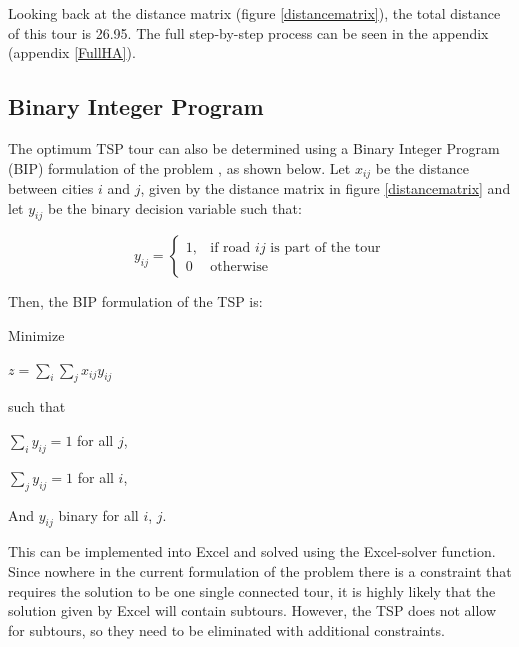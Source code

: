 \noindent
Looking back at the distance matrix (figure \ref{distancematrix}), the total distance of this tour is 26.95. \noindent The full step-by-step process can be seen in the appendix (appendix \ref{FullHA}).

\subsection{Binary Integer Program}
\label{BIP}

The optimum TSP tour can also be determined using a Binary Integer Program (BIP) formulation of the problem \cite{ORlecture}, as shown below.
\noindent
Let $x_{ij}$ be the distance between cities $i$ and $j$, given by the distance matrix in figure \ref{distancematrix} and let $y_{ij}$ be the binary decision variable such that:

\[
y_{ij}= 
\begin{cases}
1, & \text{if road $ij$ is part of the tour}\\
0 & \text{otherwise}
\end{cases}
\]
	
\vspace{5mm}
\noindent
Then, the BIP formulation of the TSP is:
\vspace{5mm}	

\noindent
Minimize

\vspace{-3mm}	
\begin{center}
$z = \sum_{i} \sum_{j} x_{ij}y_{ij}$
\end{center}	 

\noindent
such that
\vspace{-3mm}	
\begin{center}
	$\sum_{i} y_{ij}=1$ for all $j$,

	\vspace{2mm}
	$\sum_{j} y_{ij}=1$ for all $i$,

	\vspace{2mm}
	And $y_{ij}$ binary for all $i$, $j$.
\end{center}	
	
\vspace{3mm}	
This can be implemented into Excel and solved using the Excel-solver function. Since nowhere in the current formulation of the problem there is a constraint that requires the solution to be one single connected tour, it is highly likely that the solution given by Excel will contain subtours. However, the TSP does not allow for subtours, so they need to be eliminated with additional constraints.

